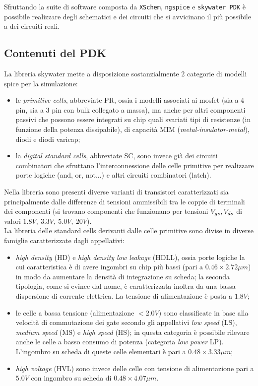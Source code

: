 	
	Sfruttando la suite di software composta da \texttt{XSchem}, \texttt{ngspice} e \texttt{skywater PDK} è possibile realizzare degli schematici e dei circuiti che si avvicinano il più possibile a dei circuiti reali.
	
	\subsection*{Contenuti del PDK}
		La libreria skywater mette a disposizione sostanzialmente 2 categorie di modelli spice per la simulazione:
		\begin{itemize}
			\item le \textit{primitive cells}, abbreviate PR, ossia i modelli associati ai mosfet (sia a 4 pin, sia a 3 pin con bulk collegato a massa), ma anche per altri componenti passivi che possono essere integrati su chip quali svariati tipi di resistenze (in funzione della potenza dissipabile), di capacità MIM (\textit{metal-insulator-metal}), diodi e diodi varicap;
			
			\item la \textit{digital standard cells}, abbreviate SC, sono invece già dei circuiti combinatori che sfruttano l'interconnessione delle celle primitive per realizzare porte logiche (and, or, not...) e altri circuiti combinatori (latch).
		\end{itemize}
		
		Nella libreria sono presenti diverse varianti di transistori caratterizzati sia principalmente dalle differenze di tensioni ammissibili tra le coppie di terminali dei componenti (si trovano componenti che funzionano per tensioni $V_{gs},V_{ds}$ di valori $1.8V,\ 3.3V,\ 5.0V, \ 20V$).\\
		La libreria delle standard cells derivanti dalle celle primitive sono divise in diverse famiglie caratterizzate dagli appellativi:
		\begin{itemize}
			\item \textit{high density} (HD) e \textit{high density low leakage} (HDLL), ossia porte logiche la cui caratteristica è di avere ingombri su chip più bassi (pari a $0.46\times 2.72 \mu m$) in modo da aumentare la densità di integrazione su scheda; la seconda tipologia, come si evince dal nome, è caratterizzata inoltra da una bassa dispersione di corrente elettrica. La tensione di alimentazione è posta a $1.8V$;
			\item le celle a bassa tensione (alimentazione $<2.0V$) sono classificate in base alla velocità di commutazione dei gate secondo gli appellativi \textit{low speed} (LS), \textit{medium speed} (MS) e \textit{high speed} (HS); in questa categoria è possibile rilevare anche le celle a basso consumo di potenza (categoria \textit{low power} LP). L'ingombro su scheda di queste celle elementari è pari a $0.48\times 3.33\mu m$;
			\item \textit{high voltage} (HVL) sono invece delle celle con tensione di alimentazione pari a $5.0V$ con ingombro su scheda di $0.48\times 4.07 \mu m$.
		\end{itemize}
	
